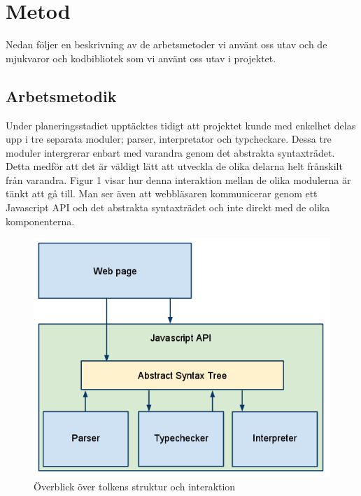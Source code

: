 \section{Metod} 

Nedan följer en beskrivning av de arbetsmetoder vi använt oss utav och de mjukvaror och kodbibliotek som vi använt oss utav i projektet. 

\subsection{Arbetsmetodik}

Under planeringsstadiet upptäcktes tidigt att projektet kunde med enkelhet delas upp i tre separata moduler; parser, interpretator och typcheckare. Dessa tre moduler intergrerar enbart med varandra genom det abstrakta syntaxträdet. Detta medför att det är väldigt lätt att utveckla de olika delarna helt frånskilt från varandra. Figur 1 visar hur denna interaktion mellan de olika modulerna är tänkt att gå till. Man ser även att webbläsaren kommunicerar genom ett Javascript API och det abstrakta syntaxträdet och inte direkt med de olika komponenterna. 

\begin{figure}[H]
    \begin{center}
        \includegraphics[width=1.0\textwidth]{image1.png}
        \caption{Överblick över tolkens struktur och interaktion}
    \end{center}
\end{figure}


